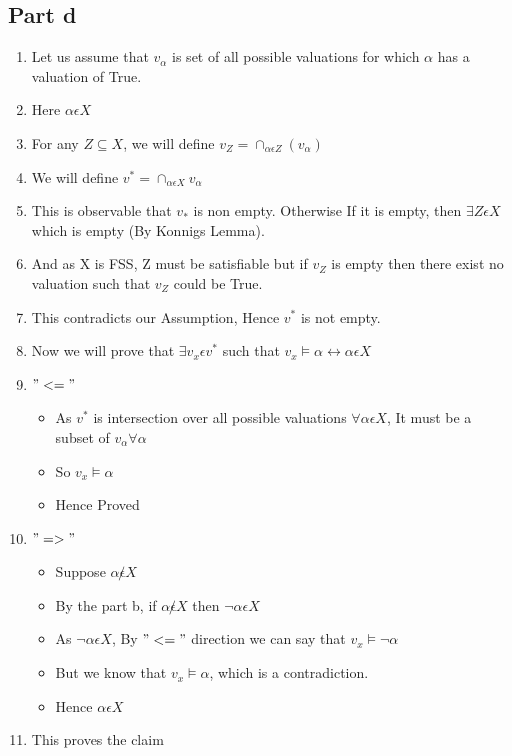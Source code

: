 \documentclass[12pt]{scrartcl}
\begin{document}
\subsection{Part d}
\begin{enumerate}
    \item Let us assume that $v_{\alpha}$ is set of all possible valuations for which $\alpha$ has a valuation of True.
    \item Here $\alpha \epsilon X$
    \item For any $Z \subseteq X$, we will define $v_{Z} = \cap_{\alpha \epsilon Z}(v_{\alpha})$
    \item We will define $v^{*} = \cap_{\alpha \epsilon X}v_{\alpha}$
    \item This is observable that $v_{*}$ is non empty. Otherwise If it is empty, then $\exists Z \epsilon X$ which is empty (By Konnigs Lemma).
    \item And as X is FSS, Z must be satisfiable but if $v_{Z}$ is empty then there exist no valuation such that $v_{Z}$ could be True.
    \item This contradicts our Assumption, Hence $v^{*}$ is not empty.
    \item Now we will prove that $\exists v_{x} \epsilon v^{*}$ such that $v_{x} \models \alpha \leftrightarrow \alpha \epsilon X$
    \item $"<="$
    \begin{itemize}
        \item As $v^*$ is intersection over all possible valuations $\forall \alpha \epsilon X$, It must be a subset of $v_{\alpha} \forall \alpha$
        \item So $v_{x} \models \alpha$
        \item Hence Proved
    \end{itemize}
    \item $"=>"$
    \begin{itemize}
        \item Suppose $\alpha \not \epsilon X$
        \item By the part b, if $\alpha \not \epsilon X$ then $\neg \alpha \epsilon X$
        \item As $\neg \alpha \epsilon X$, By $"<="$ direction we can say that $v_{x} \models \neg \alpha$
        \item But we know that $v_{x} \models \alpha$, which is a contradiction.
        \item Hence $\alpha \epsilon X$
    \end{itemize}
    \item This proves the claim
\end{enumerate}
\end{document}
